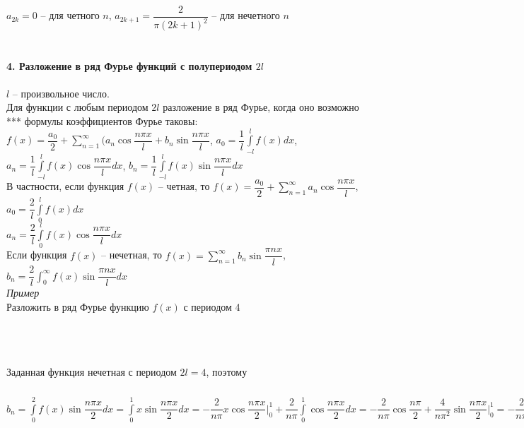 \documentclass{article}
\numberwithin{equation}{section}
\begin{document}
$a_{2k}=0$ -- для четного $n$, $a_{2k+1}=\dfrac{2}{\pi(2k+1)^2}$ -- для нечетного $n$\\
\\\\
\textbf{4. Разложение в ряд Фурье функций с полупериодом $2l$}
\\\\
$l$ -- произвольное число.\\
Для функции с любым периодом $2l$ разложение в ряд Фурье, когда оно возможно \colorbox{red!50}{***} формулы коэффициентов Фурье таковы:\\
$f(x)=\dfrac{a_0}{2}+\sum\limits_{n=1}^\infty(a_n\cos\dfrac{n\pi x}{l}+b_n\sin\dfrac{n\pi x}{l}$, $a_0=\dfrac{1}{l}\int\limits_{-l}^{l}f(x)dx$, $a_n=\dfrac{1}{l}\int\limits_{-l}^{l}f(x)\cos\dfrac{n\pi x}{l}dx$, 
$b_n=\dfrac{1}{l}\int\limits_{-l}^{l}f(x)\sin\dfrac{n\pi x}{l}dx$\\
В частности, если функция $f(x)$ -- четная, то $f(x)=\dfrac{a_0}{2}+\sum\limits_{n=1}^\infty a_n\cos\dfrac{n\pi x}{l}$, $a_0=\dfrac{2}{l}\int\limits_0^lf(x)dx$\\ $a_n=\dfrac{2}{l}\int\limits_0^lf(x)\cos\dfrac{n\pi x}{l}dx$\\
Если функция $f(x)$ -- нечетная, то $f(x)=\sum\limits_{n=1}^\infty b_n\sin\dfrac{\pi nx}{l}$, $b_n=\dfrac{2}{l}\int_0^\infty f(x)\sin\dfrac{\pi nx}{l}dx$\\
\textit{Пример}\\
Разложить в ряд Фурье функцию $f(x)$ с периодом 4\\\\
\\\\
Заданная функция нечетная с периодом $2l=4$, поэтому\\
$b_n=\int\limits_0^2f(x)\sin\dfrac{n\pi x}{2}dx=\int\limits_0^1x\sin\dfrac{n\pi x}{2}dx=-\dfrac{2}{n\pi}x\cos\dfrac{n\pi x}{2}\bigg|_0^1+\dfrac{2}{n\pi}\int\limits_0^1\cos\dfrac{n\pi x}{2}dx=-\dfrac{2}{n\pi}\cos\dfrac{n\pi}{2}+\dfrac{4}{n\pi^2}\sin\dfrac{n\pi x}{2}\bigg|_0^1=-\dfrac{2}{n\pi}\cos\dfrac{n\pi}{2}+\dfrac{4}{n^2\pi^2}\sin\dfrac{n\pi}{2}=\begin{cases}
\dfrac{(-1)^{k+1}}{k\pi},\mbox{ при }n=2k\\
\dfrac{(-1)^k}{(2k+1)^2}\cdot\dfrac{4}{\pi^2},\mbox{ при }n=2k+1
\end{cases}$\\
\end{document}
